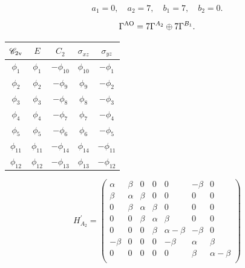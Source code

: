 \documentclass[a4paper]{book}
\newcommand{\AO}{{\rm AO}}
\newcommand{\Hp}{H^\prime}
\begin{document}
\begin{solution}
\begin{enumerate}[label=(\alph*)]
		\begin{equation*}
		a_1 = 0, \quad a_2 = 7, \quad b_1 = 7, \quad b_2 = 0.
		\end{equation*}
		
		\begin{equation*}
			\Gamma^{\AO} = 7\Gamma^{A_2} \oplus 7\Gamma^{B_1}.
		\end{equation*}
		
		\begin{center}
		\begin{tabular}{ccccc}\hline
	$\mathscr{C}_{\rm 2v}$ & $E$ & $C_2$ &	$\sigma_{xz}$	& $\sigma_{yz}$	\\ \hline
			$\phi_1$	&	$\phi_1$	&	$-\phi_{10}$	&	$\phi_{10}$	&	$-\phi_1$	\\
			$\phi_2$	&	$\phi_2$	&	$-\phi_9$	&	$\phi_9$	&	$-\phi_2$		\\
			$\phi_3$	&	$\phi_3$	&	$-\phi_8$	&	$\phi_8$	&	$-\phi_3$		\\
			$\phi_4$	&	$\phi_4$	&	$-\phi_7$	&	$\phi_7$	&	$-\phi_4$		\\ 
			$\phi_5$	&	$\phi_5$	&	$-\phi_6$	&	$\phi_6$	&	$-\phi_5$		\\ 
			$\phi_{11}$	&	$\phi_{11}$	&	$-\phi_{14}$	&	$\phi_{14}$	&	$-\phi_{11}$		\\
			$\phi_{12}$	&	$\phi_{12}$	&	$-\phi_{13}$	&	$\phi_{13}$	&	$-\phi_{12}$		\\ \hline
		\end{tabular}
		\end{center}
		
		\end{enumerate}		
		
		
		\begin{equation*}
			\Hp_{A_2} = \begin{pmatrix}
\alpha&\beta&	0	&	0	&		0	&	-\beta 	&	0	\\
\beta&\alpha&\beta	&	0	&		0	&	0	&	0	\\
0	&\beta	&\alpha	&\beta	&		0	&	0	&	0	\\
0	&	0	&\beta	&\alpha	&	\beta	&	0	&	0	\\
0	&	0	&	0	&\beta	&\alpha-\beta&	-\beta	&	0\\
-\beta&	0	&	0	&	0	& -\beta	&	\alpha	&	\beta \\
0	&	0	&	0	&	0	&	0		&	\beta	&\alpha-\beta\\
			\end{pmatrix}					
		\end{equation*}
		

\end{solution}
\end{document}
